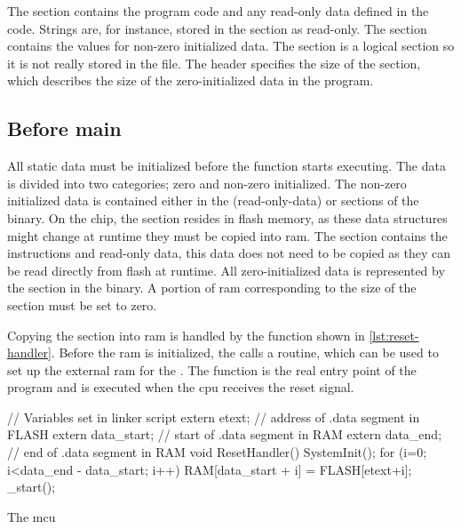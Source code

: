The  section contains the program code and any read-only data defined in the code.
Strings are, for instance, stored in the  section as read-only.
The  section contains the values for non-zero initialized data.
The  section is a logical section so it is not really stored in the file.
The header specifies the size of the  section, which describes the size of the zero-initialized data in the program.

\subsection{Before main}
\label{sec:before-main}
All static data must be initialized before the  function starts executing.
The data is divided into two categories; zero and non-zero initialized.
The non-zero initialized data is contained either in the  (read-only-data) or  sections of the {\elf} binary.
On the chip, the  section resides in flash memory, as these data structures might change at runtime they must be copied into \gls{ram}.
The  section contains the instructions and read-only data, this data does not need to be copied as they can be read directly from flash at runtime.
All zero-initialized data is represented by the  section in the {\elf} binary.
A portion of \gls{ram} corresponding to the size of the  section must be set to zero.

Copying the  section into \gls{ram} is handled by the  function shown in \autoref{lst:reset-handler}.
Before the \gls{ram} is initialized, the  calls a  routine, which can be used to set up the external \gls{ram} for the {\gecko}.
The function is the real entry point of the program and is executed when the \gls{cpu} receives the reset signal.

\begin{listing}[H]
\begin{ccode}
// Variables set in linker script
extern etext;      // address of .data segment in FLASH
extern data_start; // start of .data segment in RAM
extern data_end;   // end of .data segment in RAM
void ResetHandler() {
  SystemInit();
  for (i=0; i<data_end - data_start; i++){
    RAM[data_start + i] = FLASH[etext+i];
  }
  _start();
}
\end{ccode}
\caption{The \gls{mcu} }
\label{lst:reset-handler}
\end{listing}

